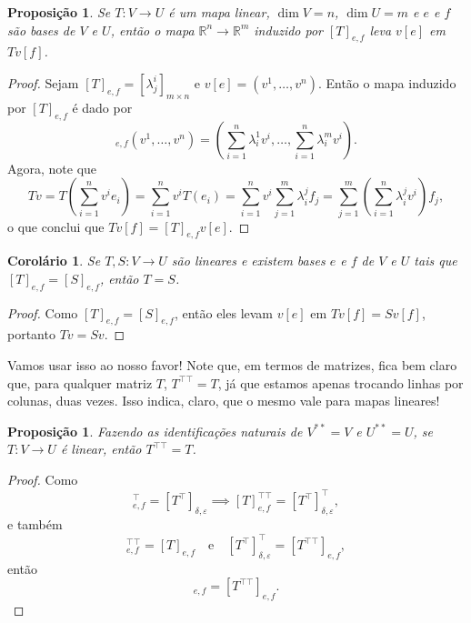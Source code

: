 \documentclass{article}
\newtheorem{proposition}[definition]{Proposição}
\newtheorem{corollary}[definition]{Corolário}
\begin{document}
\begin{proposition}
    Se $T \colon V \to U$ é um mapa linear, $\dim V = n$, $\dim U = m$ e $e$ e $f$ são bases de $V$ e $U$, então o mapa $\mathbb{R}^n \to \mathbb{R}^m$ induzido por $[T]_{e,f}$ leva $v[e]$ em $Tv[f]$.
\end{proposition}
\begin{proof}
    Sejam $[T]_{e,f} = [\lambda^i_j]_{m \times n}$ e $v[e] = (v^1, \dots, v^n)$. Então o mapa induzido por $[T]_{e,f}$ é dado por \begin{equation}
        [T]_{e,f}(v^1, \dots, v^n) = \left(\sum_{i = 1}^n \lambda^1_i v^i, \dots, \sum_{i = 1}^n \lambda^m_i v^i\right).
    \end{equation} Agora, note que \begin{equation}
        Tv = T\left(\sum_{i = 1}^n v^i e_i\right) = \sum_{i = 1}^n v^i T(e_i) = \sum_{i = 1}^n v^i \sum_{j = 1}^m \lambda^j_i f_j = \sum_{j = 1}^m \left(\sum_{i = 1}^n \lambda^j_i v^i\right) f_j,
    \end{equation} o que conclui que $Tv[f] = [T]_{e,f}v[e]$.
\end{proof}

\begin{corollary}
    Se $T, S \colon V \to U$ são lineares e existem bases $e$ e $f$ de $V$ e $U$ tais que $[T]_{e,f} = [S]_{e,f}$, então $T = S$.
\end{corollary}
\begin{proof}
    Como $[T]_{e,f} = [S]_{e,f}$, então eles levam $v[e]$ em $Tv[f] = Sv[f]$, portanto $Tv = Sv$.
\end{proof}

Vamos usar isso ao nosso favor! Note que, em termos de matrizes, fica bem claro que, para qualquer matriz $T$, $T^{\top\top} = T$, já que estamos apenas trocando linhas por colunas, duas vezes. Isso indica, claro, que o mesmo vale para mapas lineares!

\begin{proposition}
    Fazendo as identificações naturais de $V^{**} = V$ e $U^{**} = U$, se $T \colon V \to U$ é linear, então $T^{\top\top} = T$.
\end{proposition}
\begin{proof}
    Como \begin{equation}
        [T]^\top_{e,f} = [T^\top]_{\delta, \varepsilon} \implies [T]^{\top \top}_{e,f} = [T^\top]^\top_{\delta, \varepsilon},
    \end{equation} e também \begin{equation}
        [T]^{\top\top}_{e,f} = [T]_{e,f} \quad \text{e} \quad [T^\top]^\top_{\delta, \varepsilon} = [T^{\top\top}]_{e,f},
    \end{equation} então \begin{equation}
        [T]_{e,f} = [T^{\top\top}]_{e,f}.
    \end{equation}
\end{proof}
\end{document}
